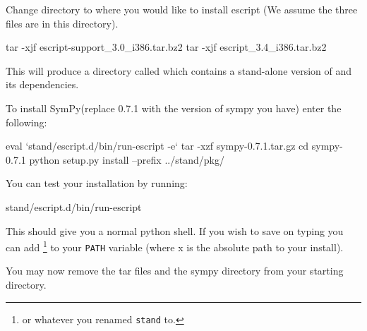 Change directory to where you would like to install escript (We assume the three files are in this directory).

\begin{shellCode}
tar -xjf escript-support_3.0_i386.tar.bz2
tar -xjf escript_3.4_i386.tar.bz2

\end{shellCode}
This will produce a directory called  which contains a stand-alone version of \esfinley and its dependencies.

\noindent To install SymPy(replace 0.7.1 with the version of sympy you have) enter the following:
\begin{shellCode}
eval `stand/escript.d/bin/run-escript -e`
tar -xzf sympy-0.7.1.tar.gz 
cd sympy-0.7.1
python setup.py install --prefix ../stand/pkg/
\end{shellCode}

You can test your installation by running:
\begin{shellCode}
stand/escript.d/bin/run-escript
\end{shellCode}
This should give you a normal python shell.
If you wish to save on typing you can add \footnote{or whatever you renamed \texttt{stand} to.} to your \texttt{PATH} variable (where x is the absolute path to your install).

You may now remove the tar files and the sympy directory from your starting directory.
